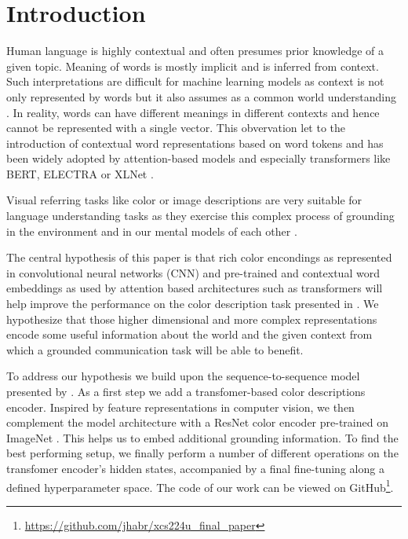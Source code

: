 \section{Introduction}

Human language is highly contextual and often presumes prior knowledge of a given topic. Meaning of words is mostly implicit and is inferred from context. Such interpretations are difficult for machine learning models as context is not only represented by words but it also assumes as a common world understanding \citep{monroe-2017-colors}. In reality, words can have different meanings in different contexts and hence cannot be represented with a single vector. This obvervation let to the introduction of contextual word representations based on word tokens and has been widely adopted by attention-based models and especially transformers like BERT, ELECTRA or XLNet \citep{smith-2019-contextual,vaswani-2017-attention}.

\par
Visual referring tasks like color or image descriptions are very suitable for language understanding tasks as they exercise this complex process of grounding in the environment and in our mental models of each other \citep{monroe-2017-colors, karpathy-2014-image_descriptions}.

\par
The central hypothesis of this paper is that rich color encondings as represented in convolutional neural networks (CNN) and pre-trained and contextual word embeddings as used by attention based architectures such as transformers will help improve the performance on the color description task presented in \citep{monroe-2017-colors}. We hypothesize that those higher dimensional and more complex representations encode some useful information about the world and the given context from which a grounded communication task will be able to benefit.

\par
To address our hypothesis we build upon the sequence-to-sequence model presented by \citep{monroe-2017-colors}. As a first step we add a transfomer-based color descriptions encoder. Inspired by feature representations in computer vision, we then complement the model architecture with a ResNet color encoder pre-trained on ImageNet \citep{deng-2009-imagenet}. This helps us to embed additional grounding information. To find the best performing setup, we finally perform a number of different operations on the transfomer encoder's hidden states, accompanied by a final fine-tuning along a defined hyperparameter space. The code of our work can be viewed on GitHub\footnote{\url{https://github.com/jhabr/xcs224u_final_paper}}.
